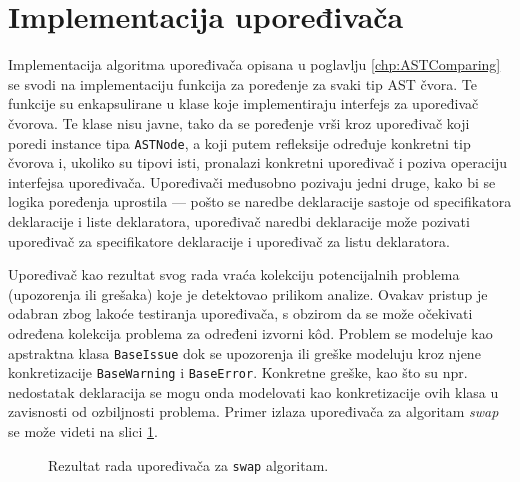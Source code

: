 \section{Implementacija upoređivača}
\label{sec:ImplementationComparer}

Implementacija algoritma upoređivača opisana u poglavlju \ref{chp:ASTComparing} se svodi na implementaciju funkcija za poređenje za svaki tip AST čvora. Te funkcije su enkapsulirane u klase koje implementiraju interfejs za upoređivač čvorova. Te klase nisu javne, tako da se poređenje vrši kroz upoređivač koji poredi instance tipa \texttt{ASTNode}, a koji putem refleksije određuje konkretni tip čvorova i, ukoliko su tipovi isti, pronalazi konkretni upoređivač i poziva operaciju interfejsa upoređivača. Upoređivači međusobno pozivaju jedni druge, kako bi se logika poređenja uprostila --- pošto se naredbe deklaracije sastoje od specifikatora deklaracije i liste deklaratora, upoređivač naredbi deklaracije može pozivati upoređivač za specifikatore deklaracije i upoređivač za listu deklaratora. 

Upoređivač kao rezultat svog rada vraća kolekciju potencijalnih problema (upozorenja ili grešaka) koje je detektovao prilikom analize. Ovakav pristup je odabran zbog lakoće testiranja upoređivača, s obzirom da se može očekivati određena kolekcija problema za određeni izvorni k\^od. Problem se modeluje kao apstraktna klasa \texttt{BaseIssue} dok se upozorenja ili greške modeluju kroz njene konkretizacije \texttt{BaseWarning} i \texttt{BaseError}. Konkretne greške, kao što su npr. nedostatak deklaracija se mogu onda modelovati kao konkretizacije ovih klasa u zavisnosti od ozbiljnosti problema. Primer izlaza upoređivača za algoritam \emph{swap} se može videti na slici \ref{fig:ComparerSwap}.

\begin{figure}[h!]
\centering
\caption{Rezultat rada upoređivača za \texttt{swap} algoritam.}
\label{fig:ComparerSwap}
\end{figure}
